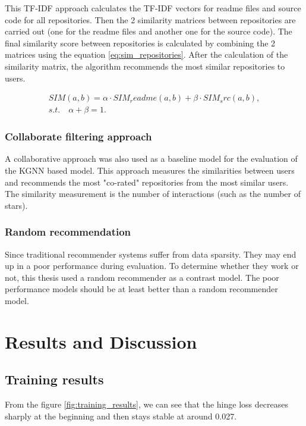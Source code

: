 \documentclass[11pt,twoside]{report}
\begin{document}
This TF-IDF approach calculates the TF-IDF vectors for readme files and source code for all repositories. Then the 2 similarity matrices between repositories are carried out (one for the readme files and another one for the source code). The final similarity score between repositories is calculated by combining the 2 matrices using the equation \ref{eq:sim_repositories}. After the calculation of the similarity matrix, the algorithm recommends the most similar repositories to users.

\begin{gather}
    SIM(a,b)=\alpha\cdot{SIM_readme(a,b)}+\beta\cdot{SIM_src(a,b)}, \\
    s.t.\quad\alpha+\beta=1.
    \label{eq:sim_repositories}
\end{gather}

\subsection{Collaborate filtering approach}
A collaborative approach \cite{guendouz_recommending_2015} was also used as a baseline model for the evaluation of the KGNN based model. This approach measures the similarities between users and recommends the most "co-rated" repositories from the most similar users. The similarity measurement is the number of interactions (such as the number of stars).


\subsection{Random recommendation}
Since traditional recommender systems suffer from data sparsity. They may end up in a poor performance during evaluation. To determine whether they work or not, this thesis used a random recommender as a contrast model. The poor performance models should be at least better than a random recommender model.

\chapter{Results and Discussion}
\section{Training results}
From the figure \ref{fig:training_results}, we can see that the hinge loss decreases sharply at the beginning and then stays stable at around 0.027.
\end{document}

